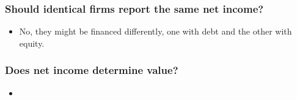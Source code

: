 \documentclass{article}
\begin{document}
\subsubsection{Should identical firms report the same net income?}
\begin{itemize}
    \item No, they might be financed differently, one with debt and the other with equity. 
\end{itemize}

\subsubsection{Does net income determine value?}
\begin{itemize}
    \item 
\end{itemize}


\end{document}
